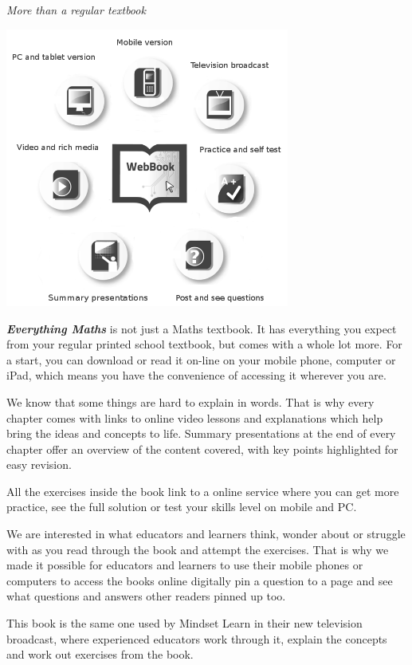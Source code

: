 
\newpage
\thispagestyle{empty}

{\normalfont\sffamily\fontsize{22}\normalfont\itshape More than a regular textbook} \par

\begin{center}
\includegraphics[width=0.70\textwidth]{../title_images/morethantextbook.png}
\end{center}

\par
{\Large
\textbf{\textit{Everything Maths}} is not just a Maths textbook. It has everything you expect from
your regular printed school textbook, but comes with a whole lot more. For a start, you can download or read it
on-line on your mobile phone, computer or iPad, which means you have the convenience of accessing
it wherever you are.\par


We know that some things are hard to explain in words. That is why every chapter comes with links to online video
lessons and explanations which help bring the ideas and concepts to life. Summary presentations at
the end of every chapter offer an overview of the content covered, with key points highlighted for easy
revision.\par


All the exercises inside the book link to a online service where you can get more practice, see the full solution
or test your skills level on mobile and PC.\par


We are interested in what educators and learners think, wonder about or struggle with as you read through the book and
attempt the exercises. That is why we made it possible for educators and learners to use their mobile phones or computers to access the books online
digitally pin a question to a page and see what questions and answers other readers pinned up too.\par


This book is the same one used by Mindset Learn in their new television broadcast, where experienced educators work through it, explain the concepts and work out exercises from the book.
}




